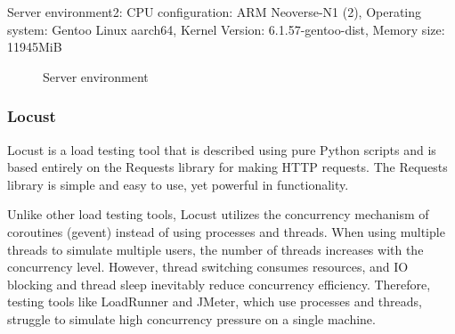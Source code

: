 \documentclass[journal]{IEEEtran}
\begin{document}
Server environment2:
CPU configuration: ARM Neoverse-N1 (2),
Operating system: Gentoo Linux aarch64,
Kernel Version: 6.1.57-gentoo-dist,
Memory size: 11945MiB

\begin{figure}[h]
  \centering
{}
  \hfill
{}
\caption{Server environment}
\label{fig:evalusrv} 
\end{figure}


\subsubsection{Locust}
Locust is a load testing tool that is described using pure Python scripts and is based entirely on the Requests library for making HTTP requests. The Requests library is simple and easy to use, yet powerful in functionality.

Unlike other load testing tools, Locust utilizes the concurrency mechanism of coroutines (gevent) instead of using processes and threads. When using multiple threads to simulate multiple users, the number of threads increases with the concurrency level. However, thread switching consumes resources, and IO blocking and thread sleep inevitably reduce concurrency efficiency. Therefore, testing tools like LoadRunner and JMeter, which use processes and threads, struggle to simulate high concurrency pressure on a single machine.
\end{document}
